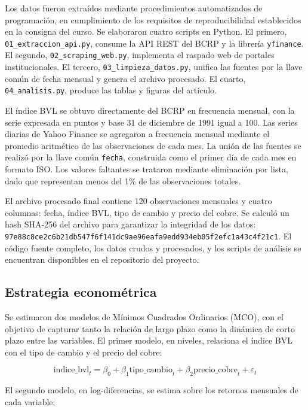 \documentclass[12pt, a4paper]{article}
\begin{document}
Los datos fueron extraídos mediante procedimientos automatizados de programación, en cumplimiento de los requisitos de reproducibilidad establecidos en la consigna del curso. Se elaboraron cuatro scripts en Python. El primero, \texttt{01\_extraccion\_api.py}, consume la API REST del BCRP y la librería \texttt{yfinance}. El segundo, \texttt{02\_scraping\_web.py}, implementa el raspado web de portales institucionales. El tercero, \texttt{03\_limpieza\_datos.py}, unifica las fuentes por la llave común de fecha mensual y genera el archivo procesado. El cuarto, \texttt{04\_analisis.py}, produce las tablas y figuras del artículo.

El índice BVL se obtuvo directamente del BCRP en frecuencia mensual, con la serie expresada en puntos y base 31 de diciembre de 1991 igual a 100. Las series diarias de Yahoo Finance se agregaron a frecuencia mensual mediante el promedio aritmético de las observaciones de cada mes. La unión de las fuentes se realizó por la llave común \texttt{fecha}, construida como el primer día de cada mes en formato ISO. Los valores faltantes se trataron mediante eliminación por lista, dado que representan menos del 1\% de las observaciones totales.

El archivo procesado final contiene 120 observaciones mensuales y cuatro columnas: fecha, índice BVL, tipo de cambio y precio del cobre. Se calculó un hash SHA-256 del archivo para garantizar la integridad de los datos: \texttt{97e88c8ce2c6b21db547f6f141dc9ae96eafa9edd934eb05f2efc1a43c4f21c1}. El código fuente completo, los datos crudos y procesados, y los scripts de análisis se encuentran disponibles en el repositorio del proyecto.

\subsection{Estrategia econométrica}

Se estimaron dos modelos de Mínimos Cuadrados Ordinarios (MCO), con el objetivo de capturar tanto la relación de largo plazo como la dinámica de corto plazo entre las variables. El primer modelo, en niveles, relaciona el índice BVL con el tipo de cambio y el precio del cobre:

\begin{equation}
\text{indice\_bvl}_t = \beta_0 + \beta_1 \text{tipo\_cambio}_t + \beta_2 \text{precio\_cobre}_t + \varepsilon_t
\end{equation}

El segundo modelo, en log-diferencias, se estima sobre los retornos mensuales de cada variable:
\end{document}
